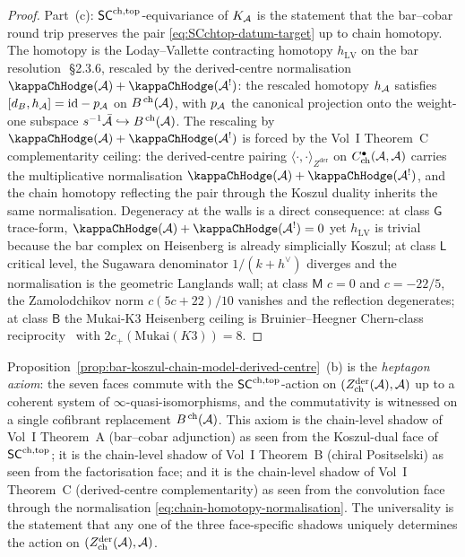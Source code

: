 \begin{proof}
Part~(c): $\mathsf{SC}^{\mathrm{ch},\mathrm{top}}$-equivariance of $K_{\mathcal{A}}$ is the statement
that the bar--cobar round trip preserves the pair
\eqref{eq:SCchtop-datum-target} up to chain homotopy. The
homotopy is the Loday--Vallette contracting homotopy
$h_{\mathrm{LV}}$ on the bar resolution~\cite{LV12}\,\S2.3.6,
rescaled by the derived-centre normalisation
$\kappaChHodge(\cA)+\kappaChHodge(\cA^!)$: the rescaled homotopy $h_{\mathcal{A}}$ satisfies
$[d_B, h_{\mathcal{A}}]=\mathrm{id}-p_{\mathcal{A}}$ on $B^{\,\mathrm{ch}}(\mathcal{A})$, with
$p_{\mathcal{A}}$ the canonical projection onto the weight-one subspace
$s^{-1}\bar{\mathcal{A}}\hookrightarrow B^{\,\mathrm{ch}}(\mathcal{A})$. The
rescaling by $\kappaChHodge(\cA)+\kappaChHodge(\cA^!)$ is forced by the Vol~I
Theorem~C complementarity ceiling: the derived-centre pairing
$\langle\cdot,\cdot\rangle_{Z^{\mathrm{der}}}$ on
$C^{\bullet}_{\mathrm{ch}}(\mathcal{A},\mathcal{A})$ carries the multiplicative
normalisation $\kappaChHodge(\cA)+\kappaChHodge(\cA^!)$, and the chain homotopy
reflecting the pair through the Koszul duality inherits the
same normalisation. Degeneracy at the walls is a direct
consequence: at class $\mathsf G$ trace-form, $\kappaChHodge(\cA)+\kappaChHodge(\cA^!)=0$
yet $h_{\mathrm{LV}}$ is trivial because the bar complex on
Heisenberg is already simplicially Koszul; at class $\mathsf L$
critical level, the Sugawara denominator $1/(k+h^{\vee})$ diverges
and the normalisation is the geometric Langlands wall; at
class $\mathsf M$ $c=0$ and $c=-22/5$, the Zamolodchikov norm
$c(5c+22)/10$ vanishes and the reflection degenerates; at
class $\mathsf B$ the Mukai-K3 Heisenberg ceiling is
Bruinier--Heegner Chern-class reciprocity~\cite{Bruinier2002}
with $2c_{+}(\mathrm{Mukai}(K3))=8$.
\end{proof}

\begin{remark}\label{rem:heptagon-axiom-universal}%
Proposition~\ref{prop:bar-koszul-chain-model-derived-centre}~(b)
is the \emph{heptagon axiom}: the seven faces commute with the
$\mathsf{SC}^{\mathrm{ch},\mathrm{top}}$-action on $(Z^{\mathrm{der}}_{\mathrm{ch}}(\mathcal{A}),\mathcal{A})$
up to a coherent system of $\infty$-quasi-isomorphisms, and the
commutativity is witnessed on a single cofibrant replacement
$B^{\,\mathrm{ch}}(\mathcal{A})$. This axiom is the chain-level shadow
of Vol~I Theorem~A (bar--cobar adjunction) as seen from the
Koszul-dual face of $\mathsf{SC}^{\mathrm{ch},\mathrm{top}}$; it is the chain-level shadow
of Vol~I Theorem~B (chiral Positselski) as seen from the
factorisation face; and it is the chain-level shadow of
Vol~I Theorem~C (derived-centre complementarity) as seen from
the convolution face through the normalisation
\eqref{eq:chain-homotopy-normalisation}. The universality is the
statement that any one of the three face-specific shadows
uniquely determines the action on
$(Z^{\mathrm{der}}_{\mathrm{ch}}(\mathcal{A}),\mathcal{A})$.
\end{remark}


